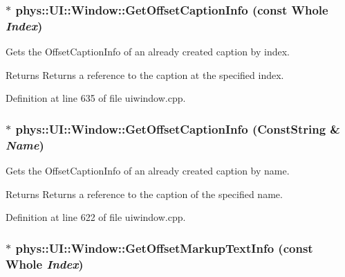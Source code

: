 \hypertarget{classphys_1_1UI_1_1Window_aaef954a5d93c48ae09f891d737019f75}{
\subsubsection[{GetOffsetCaptionInfo}]{ $\ast$ phys::UI::Window::GetOffsetCaptionInfo (const {\bf Whole} {\em Index})}}
\label{d4/d86/classphys_1_1UI_1_1Window_aaef954a5d93c48ae09f891d737019f75}


Gets the OffsetCaptionInfo of an already created caption by index. 

\begin{DoxyReturn}{Returns}
Returns a reference to the caption at the specified index. 
\end{DoxyReturn}


Definition at line 635 of file uiwindow.cpp.

\hypertarget{classphys_1_1UI_1_1Window_afa081532c017f5e8c4f04bfd2df207b6}{
\subsubsection[{GetOffsetCaptionInfo}]{ $\ast$ phys::UI::Window::GetOffsetCaptionInfo ({\bf ConstString} \& {\em Name})}}
\label{d4/d86/classphys_1_1UI_1_1Window_afa081532c017f5e8c4f04bfd2df207b6}


Gets the OffsetCaptionInfo of an already created caption by name. 

\begin{DoxyReturn}{Returns}
Returns a reference to the caption of the specified name. 
\end{DoxyReturn}


Definition at line 622 of file uiwindow.cpp.

\hypertarget{classphys_1_1UI_1_1Window_ac4f6c031c334a3165e098e7e3546bb33}{
\subsubsection[{GetOffsetMarkupTextInfo}]{ $\ast$ phys::UI::Window::GetOffsetMarkupTextInfo (const {\bf Whole} {\em Index})}}
\label{d4/d86/classphys_1_1UI_1_1Window_ac4f6c031c334a3165e098e7e3546bb33}


